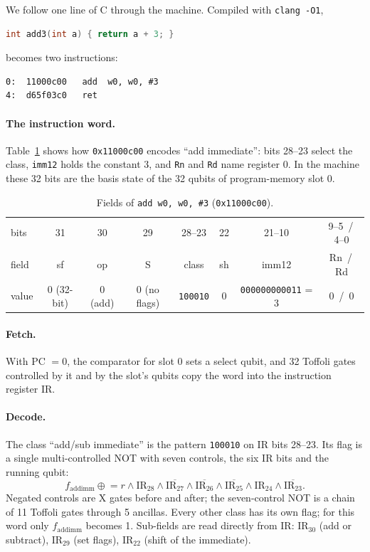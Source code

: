 \documentclass[11pt]{article}
\begin{document}
We follow one line of C through the machine. Compiled with \texttt{clang -O1},
\begin{lstlisting}[language=C]
int add3(int a) { return a + 3; }
\end{lstlisting}
becomes two instructions:
\begin{lstlisting}[language={}]
0:  11000c00   add  w0, w0, #3
4:  d65f03c0   ret
\end{lstlisting}

\paragraph{The instruction word.} Table~\ref{tab:enc} shows how \texttt{0x11000c00} encodes
``add immediate'': bits 28--23 select the class, \texttt{imm12} holds the constant 3, and
\texttt{Rn} and \texttt{Rd} name register 0. In the machine these 32 bits are the basis state
of the 32 qubits of program-memory slot 0.

\begin{table}[H]
\centering
\small
\begin{tabular}{@{}lccccccc@{}}
\toprule
bits & 31 & 30 & 29 & 28--23 & 22 & 21--10 & 9--5 \,/\, 4--0 \\
field & sf & op & S & class & sh & imm12 & Rn \,/\, Rd \\
value & 0 (32-bit) & 0 (add) & 0 (no flags) & \texttt{100010} & 0 & \texttt{000000000011} = 3 & 0 \,/\, 0 \\
\bottomrule
\end{tabular}
\caption{Fields of \texttt{add w0, w0, \#3} (\texttt{0x11000c00}).}
\label{tab:enc}
\end{table}

\paragraph{Fetch.} With PC $=0$, the comparator for slot 0 sets a select qubit, and 32 Toffoli
gates controlled by it and by the slot's qubits copy the word into the instruction register
IR.

\paragraph{Decode.} The class ``add/sub immediate'' is the pattern \texttt{100010} on IR bits
28--23. Its flag is a single multi-controlled NOT with seven controls, the six IR bits
and the running qubit:
\[
  f_{\mathrm{addimm}} \mathrel{\oplus}= r \wedge \mathrm{IR}_{28} \wedge \overline{\mathrm{IR}_{27}}
  \wedge \overline{\mathrm{IR}_{26}} \wedge \overline{\mathrm{IR}_{25}} \wedge \mathrm{IR}_{24}
  \wedge \overline{\mathrm{IR}_{23}} .
\]
Negated controls are X gates before and after; the seven-control NOT is a chain of 11
Toffoli gates through 5 ancillas. Every other class has its own flag; for this word only
$f_{\mathrm{addimm}}$ becomes 1. Sub-fields are read directly from IR: $\mathrm{IR}_{30}$ (add or
subtract), $\mathrm{IR}_{29}$ (set flags), $\mathrm{IR}_{22}$ (shift of the immediate).
\end{document}
